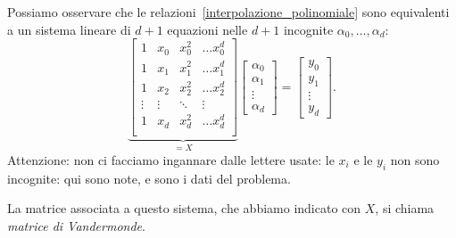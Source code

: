 \documentclass[a4paper]{report}
\theoremstyle{definiton}
\theoremstyle{remark}
\begin{document}
Possiamo osservare che le relazioni~\eqref{interpolazione_polinomiale} sono equivalenti a un sistema lineare di $d+1$ equazioni nelle $d+1$ incognite $\alpha_0,\dots,\alpha_d$:
\[
\underbrace{
\begin{bmatrix}
    1 & x_0 & x_0^2 & \dots x_0^{d}\\
    1 & x_1 & x_1^2 & \dots x_1^{d}\\
    1 & x_2 & x_2^2 & \dots x_2^{d}\\
    \vdots & \vdots & \ddots & \vdots\\
    1 & x_d & x_d^2 & \dots x_d^{d}\\
\end{bmatrix}
}_{=X}
\begin{bmatrix}
    \alpha_0 \\ \alpha_1 \\ \vdots \\ \alpha_d
\end{bmatrix}=
\begin{bmatrix}
    y_0 \\ y_1 \\ \vdots \\ y_d
\end{bmatrix}.
\]
Attenzione: non ci facciamo ingannare dalle lettere usate: le $x_i$ e le $y_i$ non sono incognite: qui sono note, e sono i dati del problema.

La matrice associata a questo sistema, che abbiamo indicato con $X$, si chiama \emph{matrice di Vandermonde}.

\end{document}
